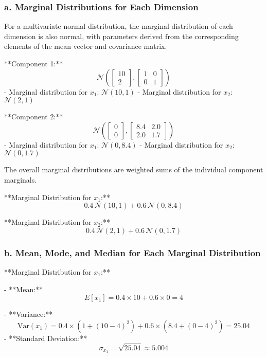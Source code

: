 \documentclass[12pt]{article}
\begin{document}
\subsubsection*{a. Marginal Distributions for Each Dimension}

For a multivariate normal distribution, the marginal distribution of each dimension is also normal, with parameters derived from the corresponding elements of the mean vector and covariance matrix.

**Component 1:**
\[
\mathcal{N} \left( \begin{bmatrix} 10 \\ 2 \end{bmatrix}, \begin{bmatrix} 1 & 0 \\ 0 & 1 \end{bmatrix} \right)
\]
- Marginal distribution for \( x_1 \): \( \mathcal{N}(10, 1) \)
- Marginal distribution for \( x_2 \): \( \mathcal{N}(2, 1) \)

**Component 2:**
\[
\mathcal{N} \left( \begin{bmatrix} 0 \\ 0 \end{bmatrix}, \begin{bmatrix} 8.4 & 2.0 \\ 2.0 & 1.7 \end{bmatrix} \right)
\]
- Marginal distribution for \( x_1 \): \( \mathcal{N}(0, 8.4) \)
- Marginal distribution for \( x_2 \): \( \mathcal{N}(0, 1.7) \)

The overall marginal distributions are weighted sums of the individual component marginals.

**Marginal Distribution for \( x_1 \):**
\[
0.4 \, \mathcal{N}(10, 1) + 0.6 \, \mathcal{N}(0, 8.4)
\]

**Marginal Distribution for \( x_2 \):**
\[
0.4 \, \mathcal{N}(2, 1) + 0.6 \, \mathcal{N}(0, 1.7)
\]

\subsubsection*{b. Mean, Mode, and Median for Each Marginal Distribution}

**Marginal Distribution for \( x_1 \):**

- **Mean:**
  \[
  E[x_1] = 0.4 \times 10 + 0.6 \times 0 = 4
  \]

- **Variance:**
  \[
  \text{Var}(x_1) = 0.4 \times (1 + (10 - 4)^2) + 0.6 \times (8.4 + (0 - 4)^2) = 25.04
  \]
  - **Standard Deviation:**
    \[
    \sigma_{x_1} = \sqrt{25.04} \approx 5.004
    \]
\end{document}
